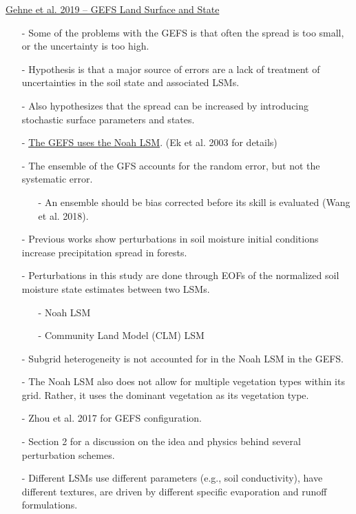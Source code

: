 \documentclass[12pt, letterpaper]{article}
\begin{document}
    \underline{Gehne et al. 2019 -- GEFS Land Surface and State}
    \begin{itemize}
    	\item[-] Some of the problems with the GEFS is that often the spread is too small, or the 
    	         uncertainty is too high.
    	\item[-] Hypothesis is that a major source of errors are a lack of treatment of uncertainties
    	         in the soil state and associated LSMs.
    	\item[-] Also hypothesizes that the spread can be increased by introducing stochastic surface
    	         parameters and states.
    	\item[-] \underline{The GEFS uses the Noah LSM}. (Ek et al. 2003 for details)
    	\item[-] The ensemble of the GFS accounts for the random error, but not the systematic error.
    	\begin{itemize}
    		\item[-] An ensemble should be bias corrected before its skill is evaluated (Wang et al. 2018).
    	\end{itemize}
        \item[-] Previous works show perturbations in soil moisture initial conditions increase 
                 precipitation spread in forests.
        \item[-] Perturbations in this study are done through EOFs of the normalized soil moisture state
                 estimates between two LSMs.
        \begin{itemize}
        	\item[-] Noah LSM
        	\item[-] Community Land Model (CLM) LSM
        \end{itemize}
        \item[-] Subgrid heterogeneity is not accounted for in the Noah LSM in the GEFS.
        \item[-] The Noah LSM also does not allow for multiple vegetation types within its grid.
                 Rather, it uses the dominant vegetation as its vegetation type.
        \item[-] Zhou et al. 2017 for GEFS configuration.
        \item[-] Section 2 for a discussion on the idea and physics behind several perturbation schemes.
        \item[-] Different LSMs use different parameters (e.g., soil conductivity), have different 
                 textures, are driven by different specific evaporation and runoff formulations.

\end{itemize}
\end{document}

